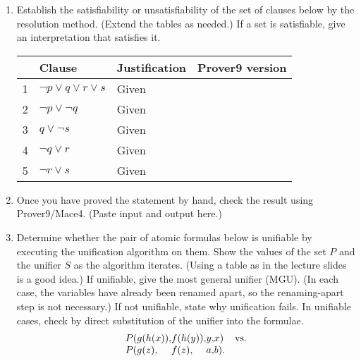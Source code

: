 \documentclass{cs81-homework}
\begin{document}
\begin{enumerate}
  \begin{solution}
  \end{solution}
  
\item {} Establish the satisfiability or unsatisfiability of the set of
  clauses below by the resolution method.  (Extend the tables as needed.)  If a
  set is satisfiable, give an interpretation that satisfies it.

  \begin{solution}
    \begin{center}
      \begin{tabular}{|l||l|l|l|}
        \hline
        & Clause & Justification & Prover9 version \\
        \hline\hline
        1 & \(\lnot p \lor q \lor r \lor s\) & Given & \\ \hline
        2 & \(\lnot p \lor \lnot q\) & Given & \\ \hline
        3 & \(q \lor \lnot s\) & Given & \\ \hline
        4 & \(\lnot q \lor r\) & Given & \\ \hline
        5 & \(\lnot r \lor s\) & Given & \\
        \hline
      \end{tabular}
    \end{center}
  \end{solution}
  
\item[]  Once you have proved the statement by hand, check the result
  using Prover9/Mace4.  (Paste input and output here.)

  \begin{solution}
  \end{solution}
  
\item {} Determine whether the pair of atomic formulas below is
  unifiable by executing the unification algorithm on them.  Show the values of
  the set \(P\) and the unifier \(S\) as the algorithm iterates.  (Using a table
  as in the lecture slides is a good idea.)  If unifiable, give the most general
  unifier (MGU).  (In each case, the variables have already been renamed apart,
  so the renaming-apart step is not necessary.)  If not unifiable, state why
  unification fails.  In unifiable cases, check by direct substitution of the
  unifier into the formulae.
  \[
    \begin{array}{l@{}l@{}l@{}l@{}ll}
      P( & g(h(x)), & f(h(y)), & y, & x) & \text{vs.} \\
      P( & g(z), & f(z), & a, & b).
    \end{array}
  \]


\end{enumerate}
\end{document}
